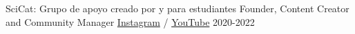 
\begin{cventries}

  \cventry
    {SciCat: Grupo de apoyo creado por y para estudiantes}
    {Founder, Content Creator and Community Manager}
    {\href{https://www.instagram.com/scicat.cl/}{Instagram} /
     \href{https://www.youtube.com/channel/UC4y3QUrci4jNY9kQ2tiS67A}{YouTube}}
    {2020-2022}
    {}


\end{cventries}
